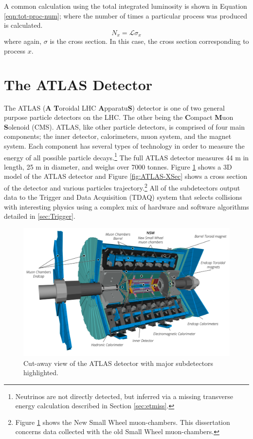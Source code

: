 		A common calculation using the total integrated luminosity is shown in Equation \ref{eqn:tot-proc-num}; where the number of times a particular process was produced is calculated.
		\begin{equation}\label{eqn:tot-proc-num}
		N_{x} = \mathcal{L} \sigma_{x}
		\end{equation}
		where again, $\sigma$ is the cross section. In this case, the cross section corresponding to process $x$.


\section{The ATLAS Detector}\label{sec:ATLAS}
	The ATLAS (\textbf{A} \textbf{T}oroidal LHC \textbf{A}pparatu\textbf{S}) detector is one of two general purpose particle detectors on the LHC. The other being the \textbf{C}ompact \textbf{M}uon \textbf{S}olenoid (CMS). ATLAS, like other particle detectors, is comprised of four main components; the inner detector, calorimeters, muon system, and the magnet system. Each component has several types of technology in order to measure the energy of all possible particle decays.\footnote{Neutrinos are not directly detected, but inferred via a missing transverse energy calculation described in Section \ref{sec:etmiss}.} The full ATLAS detector measures 44 m in length, 25 m in diameter, and weighs over 7000 tonnes. Figure \ref{fig:ATLAS} shows a 3D model of the ATLAS detector and Figure \ref{fig:ATLAS-XSec} shows a cross section of the detector and various particles trajectory.\footnote{Figure \ref{fig:ATLAS} shows the New Small Wheel muon-chambers. This dissertation concerns data collected with the old Small Wheel muon-chambers.} All of the subdetectors output data to the Trigger and Data Acquisition (TDAQ) system that selects collisions with interesting physics using a complex mix of hardware and software algorithms detailed in \ref{sec:Trigger}. 

	\begin{figure}[!ht]
	\centering
	\includegraphics[width=.75\textwidth,keepaspectratio=true]{chapters/chapter2_experiment/images/ATLAS_3d_run3.png}
	\caption{ Cut-away view of the ATLAS detector with major subdetectors highlighted.}
	\label{fig:ATLAS}
	\end{figure}

